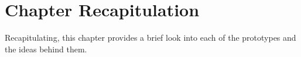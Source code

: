 \documentclass[thesis-solanki.tex]{subfiles}
\begin{document}
\section{Chapter Recapitulation}
Recapitulating, this chapter provides a brief look into each of the prototypes and the ideas behind them.

\ifMain
\begin{scope}
  \nolinenumbers
  \enotesize
  \par
  \begin{singlespace}
  \setlength{\parskip}{12pt plus 2pt minus 1pt}
  \theendnotes
  \par
  \end{singlespace}
\end{scope}
\fi
\end{document}
